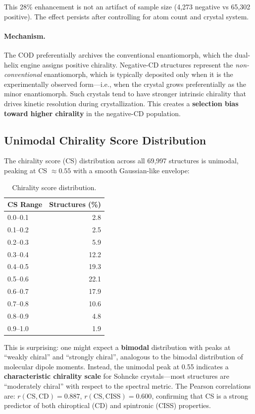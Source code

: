\documentclass[11pt,a4paper]{article}
\begin{document}
\noindent This 28\% enhancement is not an artifact of sample size (4,273 negative vs 65,302 positive). The effect persists after controlling for atom count and crystal system.

\paragraph{Mechanism.} The COD preferentially archives the conventional enantiomorph, which the dual-helix engine assigns positive chirality. Negative-CD structures represent the \emph{non-conventional} enantiomorph, which is typically deposited only when it is the experimentally observed form---i.e., when the crystal grows preferentially as the minor enantiomorph. Such crystals tend to have stronger intrinsic chirality that drives kinetic resolution during crystallization. This creates a \textbf{selection bias toward higher chirality} in the negative-CD population.

\subsection{Unimodal Chirality Score Distribution}

The chirality score (CS) distribution across all 69,997 structures is unimodal, peaking at CS $\approx 0.55$ with a smooth Gaussian-like envelope:

\begin{table}[H]
\centering
\caption{Chirality score distribution.}
\label{tab:cs_dist}
\begin{tabular}{lr}
\toprule
CS Range & Structures (\%) \\
\midrule
0.0--0.1 & 2.8 \\
0.1--0.2 & 2.5 \\
0.2--0.3 & 5.9 \\
0.3--0.4 & 12.2 \\
0.4--0.5 & 19.3 \\
0.5--0.6 & 22.1 \\
0.6--0.7 & 17.9 \\
0.7--0.8 & 10.6 \\
0.8--0.9 & 4.8 \\
0.9--1.0 & 1.9 \\
\bottomrule
\end{tabular}
\end{table}

\noindent This is surprising: one might expect a \textbf{bimodal} distribution with peaks at ``weakly chiral'' and ``strongly chiral'', analogous to the bimodal distribution of molecular dipole moments. Instead, the unimodal peak at 0.55 indicates a \textbf{characteristic chirality scale} for Sohncke crystals---most structures are ``moderately chiral'' with respect to the spectral metric. The Pearson correlations are: $r(\text{CS}, \text{CD}) = 0.887$, $r(\text{CS}, \text{CISS}) = 0.600$, confirming that CS is a strong predictor of both chiroptical (CD) and spintronic (CISS) properties.
\end{document}
